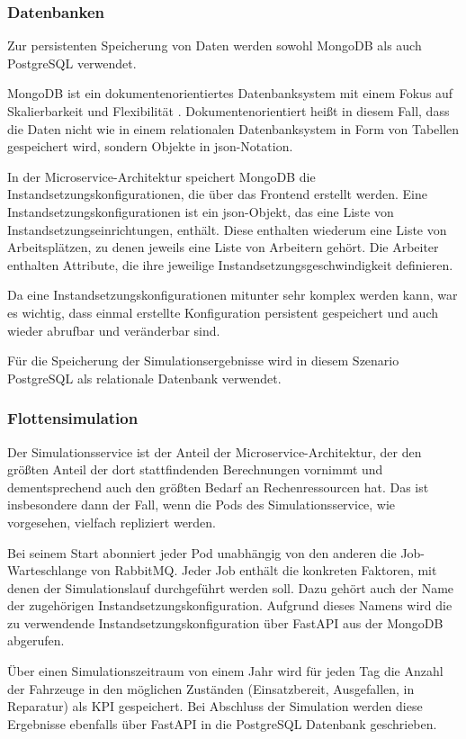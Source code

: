 \documentclass[11pt,a4paper]{article}
\begin{document}
\subsubsection{Datenbanken}
\label{sec:Datenbanken}
Zur persistenten Speicherung von Daten werden sowohl MongoDB als auch PostgreSQL verwendet.

MongoDB ist ein dokumentenorientiertes Datenbanksystem mit einem Fokus auf Skalierbarkeit und Flexibilität \cite{Bradshaw_2010}.
Dokumentenorientiert heißt in diesem Fall, dass die Daten nicht wie in einem relationalen
Datenbanksystem in Form von Tabellen gespeichert wird, sondern Objekte in json-Notation.

In der Microservice-Architektur speichert MongoDB die Instandsetzungskonfigurationen,
die über das Frontend erstellt werden.
Eine Instandsetzungskonfigurationen ist ein json-Objekt, das eine Liste von Instandsetzungseinrichtungen,
enthält. Diese enthalten wiederum eine Liste von Arbeitsplätzen, zu denen jeweils eine Liste
von Arbeitern gehört. 
Die Arbeiter enthalten Attribute, die ihre jeweilige Instandsetzungsgeschwindigkeit definieren.

Da eine Instandsetzungskonfigurationen mitunter sehr komplex werden kann, war es wichtig,
dass einmal erstellte Konfiguration persistent gespeichert und auch wieder abrufbar und veränderbar sind.

Für die Speicherung der Simulationsergebnisse wird in diesem Szenario PostgreSQL als relationale Datenbank verwendet.

\subsubsection{Flottensimulation}
\label{sec:Flottensimulation}
Der Simulationsservice ist der Anteil der Microservice-Architektur, der den größten Anteil
der dort stattfindenden Berechnungen vornimmt und dementsprechend auch den größten Bedarf
an Rechenressourcen hat. Das ist insbesondere dann der Fall, wenn die Pods des Simulationsservice,
wie vorgesehen, vielfach repliziert werden.

Bei seinem Start abonniert jeder Pod unabhängig von den anderen die Job-Warteschlange von RabbitMQ.
Jeder Job enthält die konkreten Faktoren, mit denen der Simulationslauf durchgeführt werden soll.
Dazu gehört auch der Name der zugehörigen Instandsetzungskonfiguration. Aufgrund
dieses Namens wird die zu verwendende Instandsetzungskonfiguration über FastAPI
aus der MongoDB abgerufen.

Über einen Simulationszeitraum von einem Jahr wird für jeden Tag die Anzahl der Fahrzeuge
in den möglichen Zuständen (Einsatzbereit, Ausgefallen, in Reparatur) als KPI gespeichert.
Bei Abschluss der Simulation werden diese Ergebnisse ebenfalls über FastAPI in die 
PostgreSQL Datenbank geschrieben.
\end{document}
